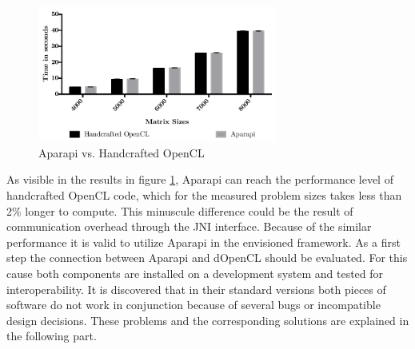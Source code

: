 \begin{figure}[H]
	\includegraphics[width=0.7\textwidth]{images/aparapivsopencl.pdf}
	\centering
	\caption{Aparapi vs. Handcrafted OpenCL}
	\label{img:aparapi_vs_opencl}
\end{figure}

As visible in the results in figure \ref{img:aparapi_vs_opencl}, Aparapi can reach the performance level of handcrafted OpenCL code, which for the measured problem sizes takes less than 2\% longer to compute. This minuscule difference could be the result of communication overhead through the JNI interface. Because of the similar performance it is valid to utilize Aparapi in the envisioned framework. As a first step the connection between Aparapi and dOpenCL should be evaluated. For this cause both components are installed on a development system and tested for interoperability. It is discovered that in their standard versions both pieces of software do not work in conjunction because of several bugs or incompatible design decisions. These problems and the corresponding solutions are explained in the following part.

